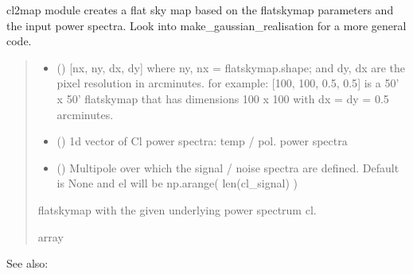 \documentclass[letterpaper,10pt,english]{sphinxmanual}
\begin{document}
\begin{fulllineitems}
\label{\detokenize{flatsky:flatsky.cl2map}}
\pysigstartsignatures
{}
\pysigstopsignatures
\sphinxAtStartPar
cl2map module \sphinxhyphen{} creates a flat sky map based on the flatskymap parameters and the input power spectra.
Look into make\_gaussian\_realisation for a more general code.
\begin{quote}\begin{description}
\begin{itemize}
\item {} 
\sphinxAtStartPar
{} () \textendash{} {[}nx, ny, dx, dy{]} where ny, nx = flatskymap.shape; and dy, dx are the pixel resolution in arcminutes.
for example: {[}100, 100, 0.5, 0.5{]} is a 50’ x 50’ flatskymap that has dimensions 100 x 100 with dx = dy = 0.5 arcminutes.

\item {} 
\sphinxAtStartPar
{} () \textendash{} 1d vector of Cl power spectra: temp / pol. power spectra

\item {} 
\sphinxAtStartPar
{} (\sphinxstyleliteralemphasis{\sphinxupquote{ (}}\sphinxstyleliteralemphasis{\sphinxupquote{)}}) \textendash{} Multipole over which the signal / noise spectra are defined.
Default is None and el will be np.arange( len(cl\_signal) )

\end{itemize}

\sphinxAtStartPar
{} \textendash{} flatskymap with the given underlying power spectrum cl.

\sphinxAtStartPar
array

\end{description}\end{quote}


\begin{sphinxseealso}{See also:}

\sphinxAtStartPar
{\hyperref[\detokenize{flatsky:flatsky.make_gaussian_realisation}]{}}


\end{sphinxseealso}


\end{fulllineitems}
\end{document}
